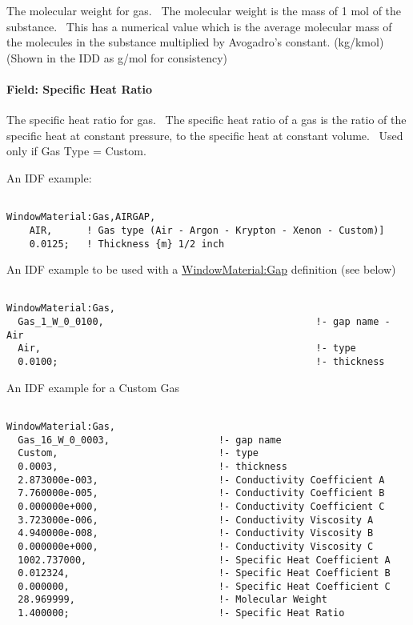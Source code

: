 The molecular weight for gas.~ The molecular weight is the mass of 1 mol of the substance.~ This has a numerical value which is the average molecular mass of the molecules in the substance multiplied by Avogadro's constant. (kg/kmol) (Shown in the IDD as g/mol for consistency)

\paragraph{Field: Specific Heat Ratio}\label{field-specific-heat-ratio-1}

The specific heat ratio for gas.~ The specific heat ratio of a gas is the ratio of the specific heat at constant pressure, to the specific heat at constant volume.~ Used only if Gas Type = Custom.

An IDF example:

\begin{lstlisting}

WindowMaterial:Gas,AIRGAP,
    AIR,      ! Gas type (Air - Argon - Krypton - Xenon - Custom)]
    0.0125;   ! Thickness {m} 1/2 inch
\end{lstlisting}

An IDF example to be used with a \hyperref[windowmaterialgap]{WindowMaterial:Gap} definition (see below)

\begin{lstlisting}

WindowMaterial:Gas,
  Gas_1_W_0_0100,                                     !- gap name - Air
  Air,                                                !- type
  0.0100;                                             !- thickness
\end{lstlisting}

An IDF example for a Custom Gas

\begin{lstlisting}

WindowMaterial:Gas,
  Gas_16_W_0_0003,                   !- gap name
  Custom,                            !- type
  0.0003,                            !- thickness
  2.873000e-003,                     !- Conductivity Coefficient A
  7.760000e-005,                     !- Conductivity Coefficient B
  0.000000e+000,                     !- Conductivity Coefficient C
  3.723000e-006,                     !- Conductivity Viscosity A
  4.940000e-008,                     !- Conductivity Viscosity B
  0.000000e+000,                     !- Conductivity Viscosity C
  1002.737000,                       !- Specific Heat Coefficient A
  0.012324,                          !- Specific Heat Coefficient B
  0.000000,                          !- Specific Heat Coefficient C
  28.969999,                         !- Molecular Weight
  1.400000;                          !- Specific Heat Ratio
\end{lstlisting}

